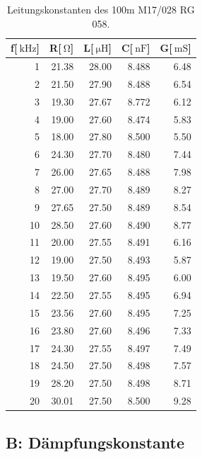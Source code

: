 \begin{table}
\centering
	\caption[]{Leitungskonstanten des 100m M17/028 RG 058.}
	\begin{tabular}{r r r r r}
	\toprule
		f[$\SI{}{\kilo\hertz}$] & R[$\SI{}{\ohm}$] & L[$\SI{}{\micro\henry}$] & C[$\SI{}{\nano \farad}$] & G[$\SI{}{\milli\siemens}$]\\
		\midrule
			  1	&	21.38	&	28.00	&	8.488	&	6.48\\
			  2	&	21.50	&	27.90	&	8.488	&	6.54\\
			  3	&	19.30	&	27.67	&	8.772	&	6.12\\
			  4	&	19.00	&	27.60	&	8.474	&	5.83\\
			  5	&	18.00	&	27.80	&	8.500	&	5.50\\
			  6	&	24.30	&	27.70	&	8.480	&	7.44\\
			  7	&	26.00	&	27.65	&	8.488	&	7.98\\
			  8	&	27.00	&	27.70	&	8.489	&	8.27\\
			  9	&	27.65	&	27.50	&	8.489	&	8.54\\
			 10	&	28.50	&	27.60	&	8.490	&	8.77\\
			 11	&	20.00	&	27.55	&	8.491	&	6.16\\
			 12	&	19.00	&	27.50	&	8.493	&	5.87\\
			 13	&	19.50	&	27.60	&	8.495	&	6.00\\
			 14	&	22.50	&	27.55	&	8.495	&	6.94\\
			 15	&	23.56	&	27.60	&	8.495	&	7.25\\
			 16	&	23.80	&	27.60	&	8.496	&	7.33\\
			 17	&	24.30	&	27.55	&	8.497	&	7.49\\
			 18	&	24.50	&	27.50	&	8.498	&	7.57\\
			 19	&	28.20	&	27.50	&	8.498	&	8.71\\
			 20	&	30.01	&	27.50	&	8.500	&	9.28\\
			\bottomrule
	\end{tabular}
	\label{tab_konst3}
\end{table}

\FloatBarrier
\subsection{B: Dämpfungskonstante} %
\label{sub:b_}

